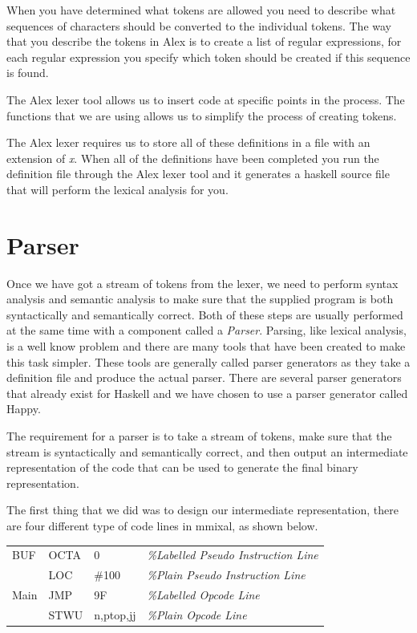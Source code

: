 \documentclass[a4paper,11pt]{report}
\begin{document}
When you have determined what tokens are allowed you need to describe what sequences of characters should be converted to the individual tokens. The way that you describe the tokens in Alex is to create a list of regular expressions, for each regular expression you specify which token should be created if this sequence is found.

The Alex lexer tool allows us to insert code at specific points in the process. The functions that we are using allows us to simplify the process of creating tokens.

The Alex lexer requires us to store all of these definitions in a file with an extension of \textit{x}. When all of the definitions have been completed you run the definition file through the Alex lexer tool and it generates a haskell source file that will perform the lexical analysis for you.
\section{Parser}
Once we have got a stream of tokens from the lexer, we need to perform syntax analysis and semantic analysis to make sure that the supplied program is both syntactically and semantically correct. Both of these steps are usually performed at the same time with a component called a \textit{Parser}. Parsing, like lexical analysis, is a well know problem and there are many tools that have been created to make this task simpler. These tools are generally called parser generators as they take a definition file and produce the actual parser. There are several parser generators that already exist for Haskell and we have chosen to use a parser generator called Happy\cite{happy}.

The requirement for a parser is to take a stream of tokens, make sure that the stream is syntactically and semantically correct, and then output an intermediate representation of the code that can be used to generate the final binary representation.

The first thing that we did was to design our intermediate representation, there are four different type of code lines in mmixal, as shown below.

\begin{centering}
\begin{tabular}{ l l l l }
BUF & OCTA & 0 & \textit{\%Labelled Pseudo Instruction Line}\\
 & LOC & \#100 & \textit{\%Plain Pseudo Instruction Line}\\
Main & JMP & 9F & \textit{\%Labelled Opcode Line}\\
 & STWU & n,ptop,jj & \textit{\%Plain Opcode Line}\\
\end{tabular}
\end{centering}
\end{document}
